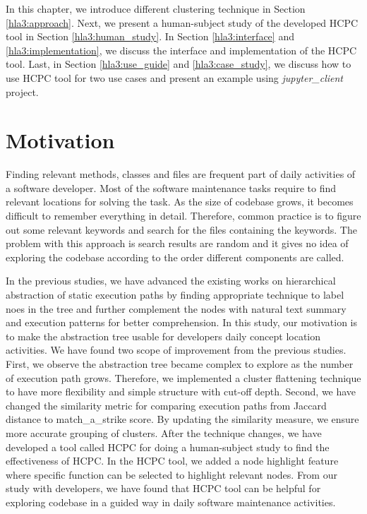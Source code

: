 \label{chapter:hla3}
In this chapter, we introduce different clustering technique in Section \ref{hla3:approach}. Next, we present a  human-subject study of the developed HCPC tool in Section \ref{hla3:human_study}. In Section \ref{hla3:interface} and \ref{hla3:implementation}, we discuss the interface and implementation of the HCPC tool. Last, in Section \ref{hla3:use_guide} and \ref{hla3:case_study}, we discuss how to use HCPC tool for two use cases and present an example using \emph{jupyter\_client} project.

\section{Motivation}
Finding relevant methods, classes and files are frequent part of daily activities of a software developer. Most of the software maintenance tasks require to find relevant locations for solving the task. As the size of codebase grows, it becomes difficult to remember everything in detail. Therefore, common practice is to figure out some relevant keywords and search for the files containing the keywords. The problem with this approach is search results are random and it gives no idea of exploring the codebase according to the order different components are called.

In the previous studies, we have advanced the existing works on hierarchical abstraction of static execution paths by finding appropriate technique to label noes in the tree and further complement the nodes with natural text summary and execution patterns for better comprehension. In this study, our motivation is to make the abstraction tree usable for developers daily concept location activities. We have found two scope of improvement from the previous studies. First, we observe the abstraction tree became complex to explore as the number of execution path grows. Therefore, we implemented a cluster flattening technique to have more flexibility and simple structure with cut-off depth. Second, we have changed the similarity metric for comparing execution paths from Jaccard distance to match\_a\_strike score. By updating the similarity measure, we ensure more accurate grouping of clusters. After the technique changes, we have developed a tool called HCPC for doing a human-subject study to find the effectiveness of HCPC. In the HCPC tool, we added a node highlight feature where specific function can be selected to highlight relevant nodes. From our study with developers, we have found that HCPC tool can be helpful for exploring codebase in a guided way in daily software maintenance activities. 



